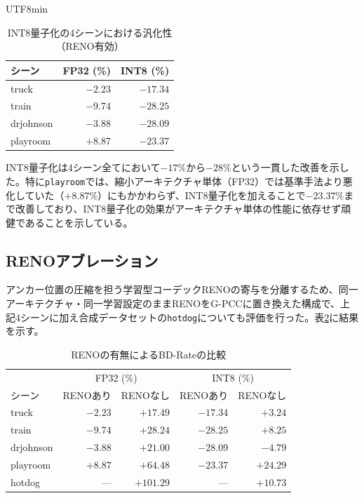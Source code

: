 \documentclass{ieeeaccess}
\begin{document}
\begin{CJK}{UTF8}{min}
\begin{table}[!t]
\renewcommand{\arraystretch}{1.2}
\caption{INT8量子化の4シーンにおける汎化性（RENO有効）}
\label{tab:generalization}
\centering
\begin{tabular}{lrr}
\toprule
シーン & FP32 (\%) & INT8 (\%) \\
\midrule
truck & $-2.23$ & $-17.34$ \\
train & $-9.74$ & $-28.25$ \\
drjohnson & $-3.88$ & $-28.09$ \\
playroom & $+8.87$ & $-23.37$ \\
\bottomrule
\end{tabular}
\end{table}

INT8量子化は4シーン全てにおいて$-17\%$から$-28\%$という一貫した改善を示した。特に\texttt{playroom}では、縮小アーキテクチャ単体（FP32）では基準手法より悪化していた（$+8.87\%$）にもかかわらず、INT8量子化を加えることで$-23.37\%$まで改善しており、INT8量子化の効果がアーキテクチャ単体の性能に依存せず頑健であることを示している。

\subsection{RENOアブレーション}
アンカー位置の圧縮を担う学習型コーデックRENOの寄与を分離するため、同一アーキテクチャ・同一学習設定のままRENOをG-PCCに置き換えた構成で、上記4シーンに加え合成データセットの\texttt{hotdog}についても評価を行った。表\ref{tab:reno-ablation}に結果を示す。

\begin{table}[!t]
\renewcommand{\arraystretch}{1.2}
\caption{RENOの有無によるBD-Rateの比較}
\label{tab:reno-ablation}
\centering
\begin{tabular}{lrrrr}
\toprule
 & \multicolumn{2}{c}{FP32 (\%)} & \multicolumn{2}{c}{INT8 (\%)} \\
シーン & RENOあり & RENOなし & RENOあり & RENOなし \\
\midrule
truck & $-2.23$ & $+17.49$ & $-17.34$ & $+3.24$ \\
train & $-9.74$ & $+28.24$ & $-28.25$ & $+8.25$ \\
drjohnson & $-3.88$ & $+21.00$ & $-28.09$ & $-4.79$ \\
playroom & $+8.87$ & $+64.48$ & $-23.37$ & $+24.29$ \\
hotdog & --- & $+101.29$ & --- & $+10.73$ \\
\bottomrule
\end{tabular}
\end{table}


\end{CJK}
\end{document}
